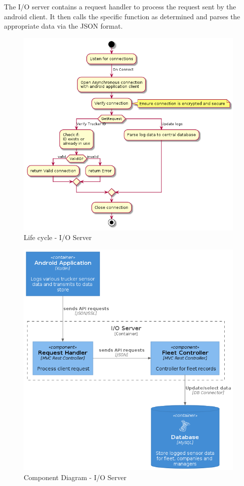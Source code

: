 The I/O server contains a request handler to process the request sent by the android client.
It then calls the specific function as determined and parses the appropriate data via the JSON format.
\begin{figure}[H]
\centering
\includegraphics[width=6in]{IO_activity.png}
\caption{Life cycle - I/O Server}
\label{fig:IO_activity}
\end{figure}

\begin{figure}[H]
\centering
\includegraphics[width=6in]{IO_component.png}
\caption{Component Diagram - I/O Server}
\label{fig:IO_component}
\end{figure}

